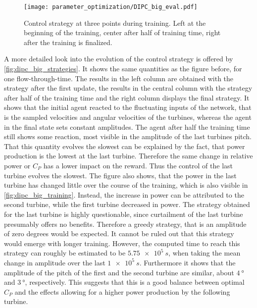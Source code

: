 \begin{figure}[h]
	\centering
	\texttt{[image: parameter\_optimization/DIPC\_big\_eval.pdf]}
	\caption{Control strategy at three points during training. Left at the beginning of the training, center after half of training time, right after the training is finalized.}
	\label{fig:dipc_big_strategies}
\end{figure}
A more detailed look into the evolution of the control strategy is offered by \autoref{fig:dipc_big_strategies}. It shows the same quantities as the figure before, for one flow-through-time. The results in the left column are obtained with the strategy after the first update, the results in the central column with the strategy after half of the training time and the right column displays the final strategy. It shows that the initial agent reacted to the fluctuating inputs of the network, that is the sampled velocities and angular velocities of the turbines, whereas the agent in the final state sets constant amplitudes. The agent after half the training time still shows some reaction, most visible in the amplitude of the last turbines pitch. That this quantity evolves the slowest can be explained by the fact, that power production is the lowest at the last turbine. Therefore the same change in relative power or $C_P$ has a lower impact on the reward. Thus the control of the last turbine evolves the slowest. The figure also shows, that the power in the last turbine has changed little over the course of the training, which is also visible in \autoref{fig:dipc_big_training}. Instead, the increase in power can be attributed to the second turbine, while the first turbine decreased in power. The strategy obtained for the last turbine is highly questionable, since curtailment of the last turbine presumably offers no benefits. Therefore a greedy strategy, that is an amplitude of zero degrees would be expected. It cannot be ruled out that this strategy would emerge with longer training. However, the computed time to reach this strategy can roughly be estimated to be $\SI{5.75e5}{s}$, when taking the mean change in amplitude over the last $\SI{1e5}{s}$. Furthermore it shows that the amplitude of the pitch of the first and the second turbine are similar, about $\SI{4}{\degree}$ and $\SI{3}{\degree}$, respectively. This suggests that this is a good balance between optimal $C_P$ and the effects allowing for a higher power production by the following turbine.
